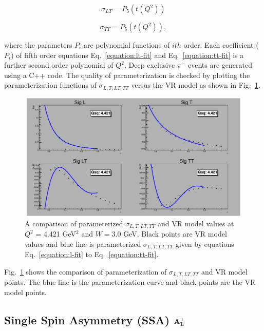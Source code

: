 \begin{equation}
        \sigma_{LT} = P_{5}(t(Q^2))        
     \label{equation:lt-fit}
\end{equation}

\begin{equation}
        \sigma_{TT} = P_{5}(t(Q^2)),        
     \label{equation:tt-fit}
\end{equation}

where the parameters $P_{i}$ are polynomial functions of $ith$ order. Each
coefficient ($P_{i}$) of fifth order equations Eq.~\ref{equation:lt-fit} and
Eq.~\ref{equation:tt-fit} is a further second order polynomial of $Q^2$. Deep
exclusive $\pi^{-}$ events are generated using a C++ code. The quality of
parameterization is checked by plotting the parameterization functions of
$\sigma_{L,T,LT,TT}$ versus the VR model as shown in Fig.~\ref{fig:sigall}.

\begin{figure}[!hbt]
    \centering
    \includegraphics[width=6.0in,height=2.4in]{./figures/pimFit.pdf}
    \caption{ A comparison of parameterized $\sigma_{L,T,LT,TT}$ and VR model
      values at $Q^2$ = 4.421 GeV$^2$ and $W = 3.0$ GeV.  Black points are VR
      model values and blue line is parameterized $\sigma_{L,T,LT,TT}$ given by
      equations Eq.~\ref{equation:l-fit} to Eq.~\ref{equation:tt-fit}. }
    \label{fig:sigall}
\end{figure}

Fig.~\ref{fig:sigall} shows the comparison of parameterization of
$\sigma_{L,T,LT,TT}$ and VR model points. The blue line is the parameterization
curve and black points are the VR model points.

\subsection{Single Spin Asymmetry (SSA) $\bf{A_{L}^{\perp}}$ }

